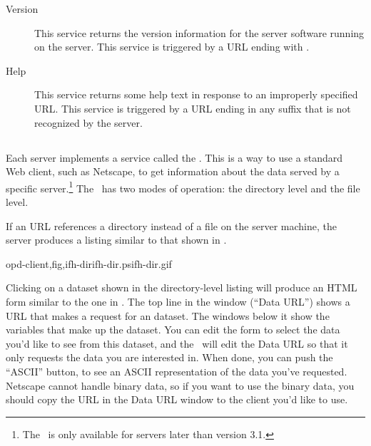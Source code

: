 \begin{description}
\item[Version] This service returns the version information for the
  \opendap server software running on the server.  This service is
  triggered by a URL ending with .

\item[Help] This service returns some help text in response to an
  improperly specified URL.  This service is triggered by a URL ending
  in any suffix that is not recognized by the \opendap server.

\end{description}


\subsection{\ifh}


Each \opendap server implements a service called the \ifh .  This is a way
to use a standard Web client, such as Netscape, to get information
about the data served by a specific server.\footnote{The \ifh\ is only
  available for servers later than version 3.1.} The \ifh\ has two
modes of operation: the directory level and the file level.

If an \opendap URL references a directory instead of a file on the server
machine, the server produces a listing similar to that shown in
.  

{opd-client,fig,ifh-dir}{ifh-dir.ps}{ifh-dir.gif}{}

Clicking on a dataset shown in the directory-level listing 
will produce an HTML form similar to the one in
.  The top line in the window (``Data
URL'') shows a URL that makes a request for an \opendap dataset.  The
windows below it show the variables that make up the dataset.  You can
edit the form to select the data you'd like to see from this dataset,
and the \ifh\ will edit the Data URL so that it only requests the data
you are interested in.  When done, you can push the ``ASCII'' button,
to see an ASCII representation of the data you've requested.  Netscape
cannot handle binary data, so if you
want to use the binary data, you should copy the URL in the Data URL
window to the \opendap client you'd like to use.

